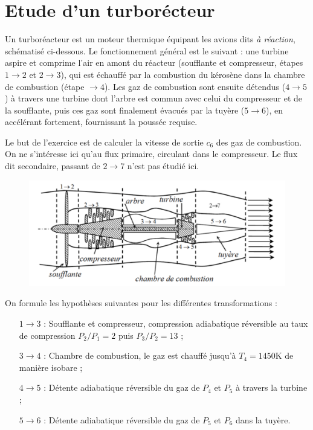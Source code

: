 \documentclass{report}
\begin{document}
\newpage	

\section*{Etude d'un turborécteur}

Un turboréacteur est un moteur thermique équipant les avions dits \textit{à réaction}, schématisé ci-dessous. Le fonctionnement général est le suivant : une turbine aspire et comprime l'air en amont du réacteur (soufflante et compresseur, étapes $1\rightarrow2$ et $2\rightarrow3$), qui est échauffé par la combustion du kérosène dans la chambre de combustion (étape $\rightarrow4$). Les gaz de combustion sont ensuite détendus ($4\rightarrow5$) à travers une turbine dont l'arbre est commun avec celui du compresseur et de la soufflante, puis ces gaz sont finalement évacués par la tuyère ($5\rightarrow6$), en accélérant fortement, fournissant la poussée requise.

Le but de l'exercice est de calculer la vitesse de sortie $c_6$ des gaz de combustion. On ne s'intéresse ici qu'au flux primaire, circulant dans le compresseur. Le flux dit secondaire, passant de $2\rightarrow7$ n'est pas étudié ici. 

\begin{figure}[!h]
\centering
	\includegraphics[width=0.65\linewidth]{turboreacteur.png}
\end{figure}

On formule les hypothèses suivantes pour les différentes transformations :
\begin{itemize}

	\item[$1\rightarrow3$ :] Soufflante et compresseur, compression adiabatique réversible au taux de compression $P_2/P_1=2$ puis $P_3/P_2=13$ ;
	\item[$3\rightarrow4$ :] Chambre de combustion, le gaz est chauffé jusqu'à $T_4=1450$K de manière isobare ;
	\item[$4\rightarrow5$ :] Détente adiabatique réversible du gaz de $P_4$ et $P_5$ à travers la turbine ;
	\item[$5\rightarrow6$ :] Détente adiabatique réversible du gaz de $P_5$ et $P_6$ dans la tuyère.

\end{itemize}
\end{document}
